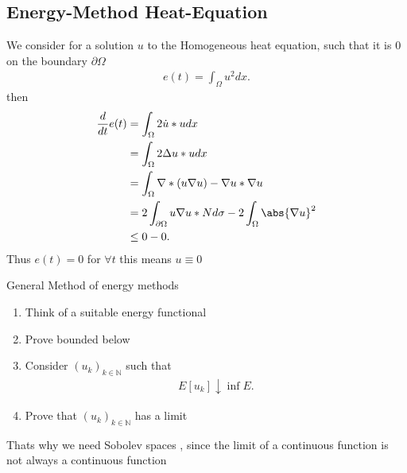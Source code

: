 \subsection{Energy-Method Heat-Equation}
We consider for a solution $u$ to the Homogeneous heat equation, such that it is $0$ on the boundary $\partial \Omega $
\begin{align*}
  e(t) = \int_\Omega  u^2 dx 
.\end{align*}
then 
\begin{align*}
  \frac{d}{dt} e(t) &= \int_{\Omega } 2 \dot{u} *u dx \\
                    &= \int_\Omega  2 \Delta  u * u dx \\
                    &= \int_{\Omega } \nabla * (u \nabla u) - \nabla u * \nabla u\\
                    &= 2 \int_{\partial \Omega} u \nabla u * N d \sigma  - 2 \int_{\Omega } \abs{\nabla u} ^2\\
                    &\le  0  - 0
.\end{align*}
Thus $e(t) = 0$ for $\forall  t$ this means $u \equiv 0$
\begin{Definition}
 General  Method of energy methods 
 \begin{enumerate}
   \item Think of a suitable energy functional
   \item Prove bounded below  
   \item Consider $(u_k)_{k \in  \mathbb{N}}$ such that 
     \begin{align*}
       E[u_k] \downarrow \inf E
     .\end{align*}
   \item Prove that $(u_k)_{k \in  \mathbb{N}}$  has a limit
 \end{enumerate}
 Thats why we need Sobolev spaces , since the limit of a continuous function is not always a continuous function
\end{Definition}
